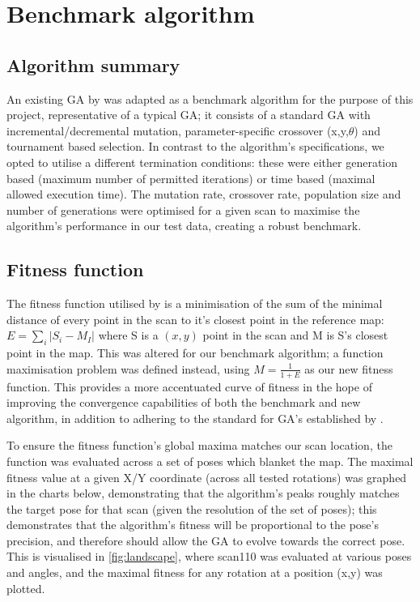 \documentclass[authoryearcitations]{UoYCSproject}
\begin{document}
\chapter{Benchmark algorithm}
\section{Algorithm summary}
An existing GA by \citet{Robertson2002-ou} was adapted as a benchmark algorithm for the purpose of this project, representative of a typical GA; it consists of a standard GA with incremental/decremental mutation, parameter-specific crossover (x,y,$\theta$) and tournament based selection. In contrast to the algorithm's specifications, we opted to utilise a different termination conditions: these were either generation based (maximum number of permitted iterations) or time based (maximal allowed execution time). The mutation rate, crossover rate, population size and number of generations were optimised for a given scan to maximise the algorithm's performance in our test data, creating a robust benchmark.

\section{Fitness function}
\label{sec:fitness_landscape}
The fitness function utilised by \citet{Robertson2002-ou} is a minimisation of the sum of the minimal distance of every point in the scan to it's closest point in the reference map: $E = \sum_i |S_i-M_I|$ where S is a $(x,y)$ point in the scan and M is S's closest point in the map. This was altered for our benchmark algorithm; a function maximisation problem was defined instead, using $M = \frac{1}{1+E}$ as our new fitness function. This provides a more accentuated curve of fitness in the hope of improving the convergence capabilities of both the benchmark and new algorithm, in addition to adhering to the standard for GA's established by \citet{Eiben2015-de}.


To ensure the fitness function's global maxima matches our scan location, the function was evaluated across a set of poses which blanket the map. The maximal fitness value at a given X/Y coordinate (across all tested rotations) was graphed in the charts below, demonstrating that the algorithm's peaks roughly matches the target pose for that scan (given the resolution of the set of poses); this demonstrates that the algorithm's fitness will be proportional to the pose's precision, and therefore should allow the GA to evolve towards the correct pose. This is visualised in \autoref{fig:landscape}, where scan110 was evaluated at various poses and angles, and the maximal fitness for any rotation at a position (x,y) was plotted.
\end{document}
